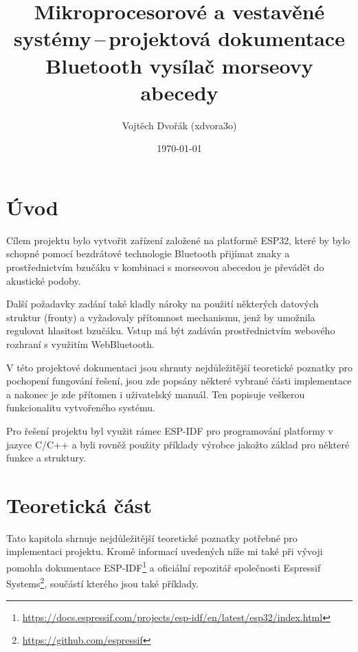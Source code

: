 \documentclass[10pt]{article}
\title{Mikroprocesorové a vestavěné systémy\,--\,projektová dokumentace\\
Bluetooth vysílač morseovy abecedy}
\author{Vojtěch Dvořák (xdvora3o)}
\date{\today}
\begin{document}
\maketitle

\section*{Úvod}
\par Cílem projektu bylo vytvořit zařízení založené na platformě ESP32, které by bylo schopné pomocí bezdrátové technologie Bluetooth přijímat znaky a prostřednictvím bzučáku v kombinaci s morseovou abecedou je převádět do akustické podoby. 
\par Další požadavky zadání také kladly nároky na použití některých datových struktur (fronty) a vyžadovaly přítomnost mechanismu, jenž by umožnila regulovat hlasitost bzučáku. Vstup má být zadáván prostřednictvím webového rozhraní s využitím WebBluetooth.
\par V této projektové dokumentaci jsou shrnuty nejdůležitější teoretické poznatky pro pochopení fungování řešení, jsou zde popsány některé vybrané části implementace a nakonec je zde přítomen i uživatelský manuál. Ten popisuje veškerou funkcionalitu vytvořeného systému.
\par Pro řešení projektu byl využit rámec ESP-IDF pro programování platformy v jazyce C/C++ a byli rovněž použity příklady výrobce jakožto základ pro některé funkce a struktury.

\section{Teoretická část}
Tato kapitola shrnuje nejdůležitější teoretické poznatky potřebné pro implementaci projektu. Kromě informací uvedených níže mi také při vývoji pomohla dokumentace ESP-IDF\footnote{\url{https://docs.espressif.com/projects/esp-idf/en/latest/esp32/index.html}} a oficiální repozitář společnosti Espressif Systems\footnote{\url{https://github.com/espressif}}, součástí kterého jsou také příklady.
\end{document}
